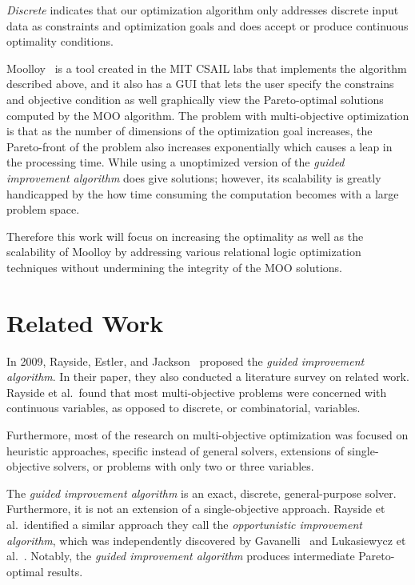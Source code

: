 \documentclass[11pt]{article}
\begin{document}
\textit{Discrete} indicates that our optimization algorithm only
addresses discrete input data as constraints and optimization goals and
does accept or produce continuous optimality conditions.

Moolloy~\cite{ref:moolloy} is a tool created in the MIT CSAIL labs that
implements the algorithm described above, and it also has a GUI that
lets the user specify the constrains and objective condition as well
graphically view the Pareto-optimal solutions computed by the MOO
algorithm. The problem with multi-objective optimization is that as the
number of dimensions of the optimization goal increases, the
Pareto-front of the problem also increases exponentially which causes a
leap in the processing time. While using a unoptimized version of the
\textit{guided improvement algorithm} does give solutions; however, its
scalability is greatly handicapped by the how time consuming the
computation becomes with a large problem space.

Therefore this work will focus on increasing the optimality as well as
the scalability of Moolloy by addressing various relational logic
optimization techniques without undermining the integrity of the MOO
solutions.

\section{Related Work}

In 2009, Rayside, Estler, and Jackson~\cite{ref:moolloy} proposed the
\textit{guided improvement algorithm}. In their paper, they also
conducted a literature survey on related work. Rayside et al.\ found
that most multi-objective problems were concerned with continuous
variables, as opposed to discrete, or combinatorial, variables.

Furthermore, most of the research on multi-objective optimization was
focused on heuristic approaches, specific instead of general solvers,
extensions of single-objective solvers, or problems with only two or
three variables.

The \textit{guided improvement algorithm} is an exact, discrete,
general-purpose solver. Furthermore, it is not an extension of a
single-objective approach. Rayside et al.\ identified a similar
approach they call the \textit{opportunistic improvement algorithm},
which was independently discovered by Gavanelli~\cite{ref:Gavanelli02}
and Lukasiewycz et al.~\cite{ref:lukas07}. Notably, the \textit{guided
improvement algorithm} produces intermediate Pareto-optimal results.
\end{document}
